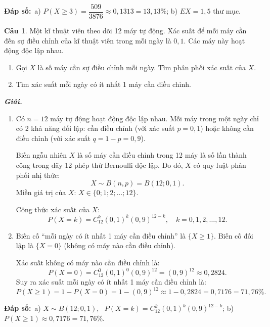 \documentclass[12pt,a4paper]{article}
\theoremstyle{definition}
\newtheorem{cau}{Câu}
\newcommand{\giai}{\noindent\textbf{\textit{Giải.}}\ }
\newcommand{\dapso}[1]{\noindent\textbf{Đáp số:}\ #1}
\begin{document}
\dapso{a) $P(X \ge 3) = \dfrac{509}{3876} \approx 0{,}1313 = 13{,}13\%$; \quad b) $EX = 1{,}5$ thư mục.}

\vspace{1.5em}
\begin{cau}
Một kĩ thuật viên theo dõi 12 máy tự động. Xác suất để mỗi máy cần đến sự điều chỉnh của kĩ thuật viên trong mỗi ngày là $0{,}1$. Các máy này hoạt động độc lập nhau.
\begin{enumerate}[label=\alph*)]
    \item Gọi $X$ là số máy cần sự điều chỉnh mỗi ngày. Tìm phân phối xác suất của $X$.
    \item Tìm xác suất mỗi ngày có ít nhất 1 máy cần điều chỉnh.
\end{enumerate}
\end{cau}

\giai
\begin{enumerate}[label=\alph*)]
    \item Có $n = 12$ máy tự động hoạt động độc lập nhau. Mỗi máy trong một ngày chỉ có 2 khả năng đối lập: cần điều chỉnh (với xác suất $p = 0{,}1$) hoặc không cần điều chỉnh (với xác suất $q = 1 - p = 0{,}9$).

    Biến ngẫu nhiên $X$ là số máy cần điều chỉnh trong 12 máy là số lần thành công trong dãy 12 phép thử Bernoulli độc lập. Do đó, $X$ có quy luật phân phối nhị thức:
    \[
    X \sim B(n, p) = B(12; 0{,}1).
    \]
    Miền giá trị của $X$: $X \in \{0; 1; 2; \dots; 12\}$.

    Công thức xác suất của $X$:
    \[
    P(X = k) = C_{12}^k (0{,}1)^k (0{,}9)^{12 - k}, \quad k = 0, 1, 2, \dots, 12.
    \]

    \item Biến cố ``mỗi ngày có ít nhất 1 máy cần điều chỉnh'' là $\{X \ge 1\}$. Biến cố đối lập là $\{X = 0\}$ (không có máy nào cần điều chỉnh).

    Xác suất không có máy nào cần điều chỉnh là:
    \[
    P(X = 0) = C_{12}^0 (0{,}1)^0 (0{,}9)^{12} = (0{,}9)^{12} \approx 0{,}2824.
    \]
    Suy ra xác suất mỗi ngày có ít nhất 1 máy cần điều chỉnh là:
    \[
    P(X \ge 1) = 1 - P(X = 0) = 1 - (0{,}9)^{12} \approx 1 - 0{,}2824 = 0{,}7176 = 71{,}76\%.
    \]
\end{enumerate}

\dapso{a) $X \sim B(12; 0{,}1)$, \ $P(X = k) = C_{12}^k (0{,}1)^k (0{,}9)^{12-k}$; \quad b) $P(X \ge 1) \approx 0{,}7176 = 71{,}76\%$.}
\end{document}
